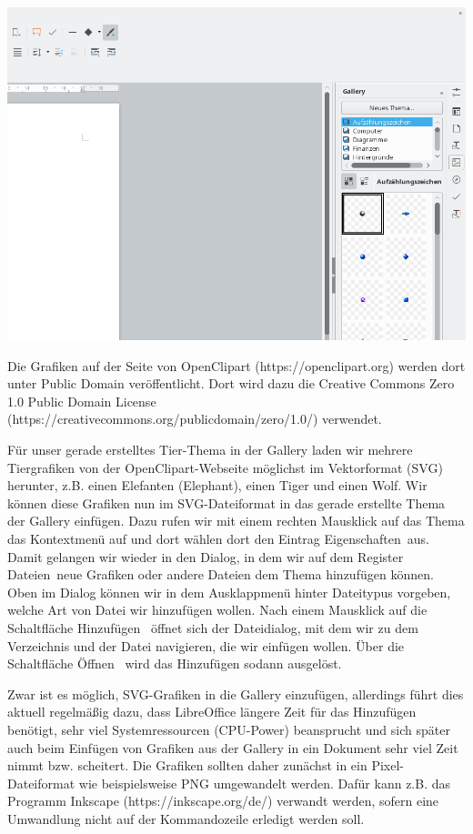 \documentclass[a4paper,10pt,pagesize,titlepage]{scrbook}
\begin{document}
\begin{center}
	\captionsetup{type=figure}
	\includegraphics[width=0.9\linewidth]{pics/libreoffice_gallery}
	\label{fig:libreoffice_gallery}
\end{center}


Die Grafiken auf der Seite von OpenClipart (https://openclipart.org) werden dort unter Public Domain veröffentlicht. Dort wird dazu die Creative Commons Zero 1.0 Public Domain License (https://creativecommons.org/publicdomain/zero/1.0/) verwendet.

Für unser gerade erstelltes Tier-Thema  in der Gallery laden wir mehrere Tiergrafiken von der OpenClipart-Webseite möglichst im Vektorformat (SVG) herunter, z.B. einen Elefanten (Elephant), einen Tiger und einen Wolf. Wir können diese Grafiken nun im SVG-Dateiformat in das gerade erstellte Thema der Gallery einfügen. Dazu rufen wir mit einem rechten Mausklick auf das Thema das Kontextmenü auf und dort wählen dort den Eintrag \glqq Eigenschaften\grqq~aus. Damit gelangen wir wieder in den Dialog, in dem wir auf dem Register \glqq Dateien\grqq~neue Grafiken oder andere Dateien dem Thema hinzufügen können. Oben im Dialog können wir in dem Ausklappmenü hinter Dateitypus vorgeben, welche Art von Datei wir hinzufügen wollen. Nach einem Mausklick auf die Schaltfläche \glqq Hinzufügen\grqq~ öffnet sich der Dateidialog, mit dem wir zu dem Verzeichnis und der Datei navigieren, die wir einfügen wollen. Über die Schaltfläche \glqq Öffnen\grqq~ wird das Hinzufügen sodann ausgelöst.

Zwar ist es möglich, SVG-Grafiken in die Gallery einzufügen, allerdings führt dies aktuell regelmäßig dazu, dass LibreOffice längere Zeit für das Hinzufügen benötigt, sehr viel Systemressourcen (CPU-Power) beansprucht und sich später auch beim Einfügen von Grafiken aus der Gallery in ein Dokument sehr viel Zeit nimmt bzw. scheitert. Die Grafiken sollten daher zunächst in ein Pixel-Dateiformat wie beispielsweise PNG umgewandelt werden. Dafür kann z.B. das Programm Inkscape (https://inkscape.org/de/) verwandt werden, sofern eine Umwandlung nicht auf der Kommandozeile erledigt werden soll.
\end{document}
